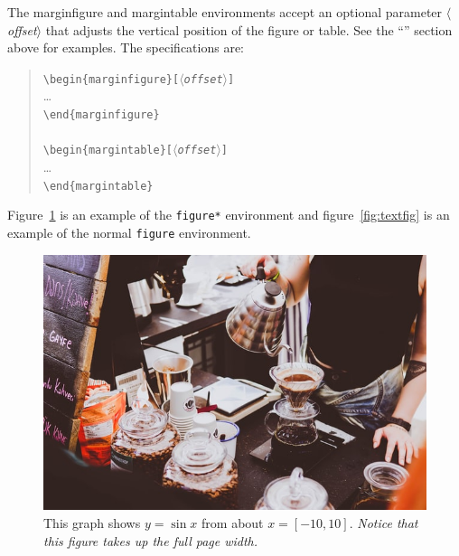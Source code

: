 \documentclass{tufte-handout}
\newcommand{\doccmd}[1]{\texttt{\textbackslash#1}}%
\newcommand{\docopt}[1]{\ensuremath{\langle}\textrm{\textit{#1}}\ensuremath{\rangle}}%
\newcommand{\docenv}[1]{\textsf{#1}}%
\newenvironment{docspec}{\begin{quote}\noindent}{\end{quote}}%
\begin{document}
The \docenv{marginfigure} and \docenv{margintable} environments accept an optional parameter \docopt{offset} that adjusts the vertical position of the figure or table.  See the ``'' section above for examples.  The specifications are:
\begin{docspec}
  \doccmd{begin\{marginfigure\}[\docopt{offset}]}\\
  \qquad\ldots\\
  \doccmd{end\{marginfigure\}}\\
  \mbox{}\\
  \doccmd{begin\{margintable\}[\docopt{offset}]}\\
  \qquad\ldots\\
  \doccmd{end\{margintable\}}\\
\end{docspec}

Figure~\ref{fig:fullfig} is an example of the \Verb|figure*|
environment and figure~\ref{fig:textfig} is an example of the normal
\Verb|figure| environment.

\begin{figure}[h]
  \includegraphics[width=\linewidth]{sample}%
  \caption{This graph shows $y = \sin x$ from about $x = [-10, 10]$.
  \emph{Notice that this figure takes up the full page width.}}%
  \label{fig:fullfig}%
\end{figure}
\end{document}
